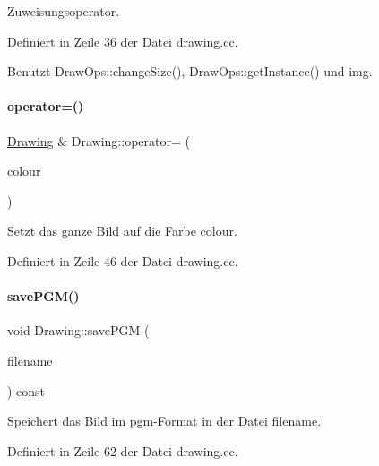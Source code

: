 Zuweisungsoperator. 



Definiert in Zeile 36 der Datei drawing.\+cc.



Benutzt Draw\+Ops\+::change\+Size(), Draw\+Ops\+::get\+Instance() und img.

\mbox{\label{classDrawing_a530fbd926b17ea337b4a1c703d95e449}} 
\paragraph{\texorpdfstring{operator=()}{operator=()}\hspace{0.1cm}{\footnotesize\ttfamily [2/2]}}
{\footnotesize\ttfamily \mbox{\hyperlink{classDrawing}{Drawing}} \& Drawing\+::operator= (\begin{DoxyParamCaption}\item[{\mbox{\hyperlink{classDrawColour}{Draw\+Colour}}}]{colour }\end{DoxyParamCaption})}



Setzt das ganze Bild auf die Farbe {\ttfamily colour}. 



Definiert in Zeile 46 der Datei drawing.\+cc.

\mbox{\label{classDrawing_a55355208f1dc677fd30806b170a14bcf}} 
\paragraph{\texorpdfstring{save\+P\+G\+M()}{savePGM()}}
{\footnotesize\ttfamily void Drawing\+::save\+P\+GM (\begin{DoxyParamCaption}\item[{const std\+::string \&}]{filename }\end{DoxyParamCaption}) const}



Speichert das Bild im pgm-\/\+Format in der Datei {\ttfamily filename}. 



Definiert in Zeile 62 der Datei drawing.\+cc.

\mbox{\label{classDrawing_aae4e25704b69cef5d37a7c5db860336d}} 
